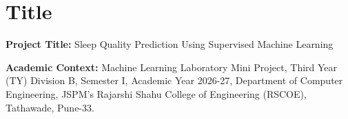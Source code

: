 \documentclass[12pt,a4paper]{article}
\newcommand{\projectTitle}{Sleep Quality Prediction Using Supervised Machine Learning}
\begin{document}
\newpage
\tableofcontents
\newpage

\section{Title}
\noindent \textbf{Project Title:} \projectTitle

\vspace{0.3cm}
\noindent \textbf{Academic Context:} Machine Learning Laboratory Mini Project, Third Year (TY) Division B, Semester I, Academic Year 2026-27, Department of Computer Engineering, JSPM's Rajarshi Shahu College of Engineering (RSCOE), Tathawade, Pune-33.

\end{document}
